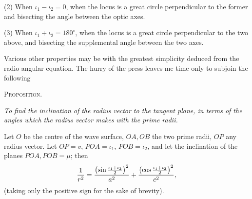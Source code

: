 \documentclass[11pt]{article}
\begin{document}
(2) When $\iota_1-\iota_2=0$, when the locus is a great circle perpendicular to the former and bisecting the angle between the optic axes.

(3) When $\iota_1+\iota_2=180^\circ$, when the locus is a great circle perpendicular to the two above, and bisecting the supplemental angle between the two axes.

Various other properties may be with the greatest simplicity deduced from the radio-angular equation. The hurry of the press leaves me time only to subjoin the following

\begin{center}{\scshape Proposition.}\end{center}

\emph{To find the inclination of the radius vector to the tangent plane, in terms of the angles which the radius vector makes with the prime radii.}

Let $O$ be the centre of the wave surface, $OA,OB$ the two prime radii, $OP$ any radius vector. Let $OP=v$, $POA=\iota_1$, $POB=\iota_2$, and let the inclination of the planes $POA,POB=\mu$; then
\[
 {1\over r^2}=\frac{\left(\sin{\iota_1+\iota_2\over2}\right)^2}{a^2}
 +\frac{\left(\cos{\iota_1+\iota_2\over2}\right)^2}{c^2},
\]
(taking only the positive sign for the sake of brevity).
\end{document}
